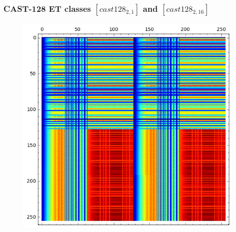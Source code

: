\documentclass[pdf,sprung,slideColor,nocolorBG]{beamer}
\newenvironment{colortheme}[1]{
\def\ProvidesPackageRCS $##1${\relax}
\renewcommand{\ProcessOptions}{\relax}
\makeatletter

\makeatother
}{}
\begin{document}
\begin{colortheme}{jubata}
\begin{frame}
\begin{figure}
\begin{minipage}{.48\textwidth}
  \label{fig:cast128_1_0_bent_cayley_graph_index_matrix}
\end{minipage}%
\end{figure}
\end{frame}

\begin{frame}
\frametitle{CAST-128 ET classes $[cast128_{2,1}]$ and $[cast128_{2,16}]$}
\begin{figure}
\centering
\begin{minipage}{.48\textwidth}
  \centering
\includegraphics[width=.9\linewidth]{../matrix_plot/cast128_2_1_bent_cayley_graph_index_matrix.png}
  \label{fig:cast128_2_1_bent_cayley_graph_index_matrix}
\end{minipage}%
\begin{minipage}{.48\textwidth}
  \centering

\end{minipage}
\end{figure}
\end{frame}
\end{colortheme}
\end{document}
